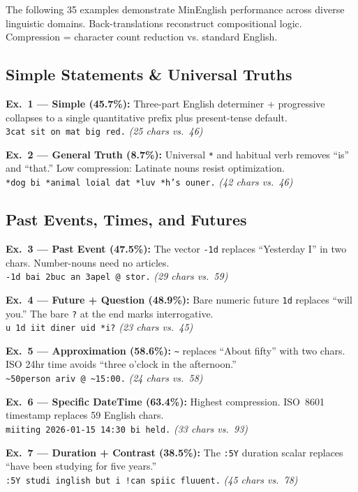 \documentclass[10pt,onecolumn,letterpaper]{article}
\newcommand{\me}[1]{\texttt{#1}}
\begin{document}
The following 35 examples demonstrate MinEnglish performance across diverse
linguistic domains. Back-translations reconstruct compositional logic.
Compression = character count reduction vs. standard English.

\subsection{Simple Statements \& Universal Truths}

\textbf{Ex.~1 --- Simple (45.7\%):} Three-part English determiner + progressive collapses to a single quantitative prefix plus present-tense default.\\
\me{3cat sit on mat big red.} \textit{(25 chars vs.\ 46)}

\textbf{Ex.~2 --- General Truth (8.7\%):} Universal \me{*} and habitual verb removes ``is'' and ``that.'' Low compression: Latinate nouns resist optimization.\\
\me{*dog bi *animal loial dat *luv *h's ouner.} \textit{(42 chars vs.\ 46)}

\subsection{Past Events, Times, and Futures}

\textbf{Ex.~3 --- Past Event (47.5\%):} The vector \me{-1d} replaces ``Yesterday I'' in two chars. Number-nouns need no articles.\\
\me{-1d bai 2buc an 3apel @ stor.} \textit{(29 chars vs.\ 59)}

\textbf{Ex.~4 --- Future + Question (48.9\%):} Bare numeric future \me{1d} replaces ``will you.'' The bare \me{?} at the end marks interrogative.\\
\me{u 1d iit diner uid *i?} \textit{(23 chars vs.\ 45)}

\textbf{Ex.~5 --- Approximation (58.6\%):} \me{\~{}} replaces ``About fifty'' with two chars. ISO 24hr time avoids ``three o'clock in the afternoon.''\\
\me{\~{}50person ariv @ \~{}15:00.} \textit{(24 chars vs.\ 58)}

\textbf{Ex.~6 --- Specific DateTime (63.4\%):} Highest compression. ISO~8601 timestamp replaces 59 English chars.\\
\me{miiting 2026-01-15 14:30 bi held.} \textit{(33 chars vs.\ 93)}

\textbf{Ex.~7 --- Duration + Contrast (38.5\%):} The \me{:5Y} duration scalar replaces ``have been studying for five years.''\\
\me{:5Y studi inglish but i !can spiic fluuent.} \textit{(45 chars vs.\ 78)}
\end{document}
